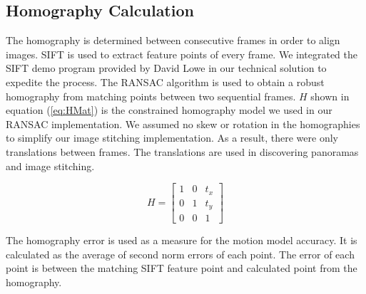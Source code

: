 \subsection{Homography Calculation} \label{sec:HomoSec}

The homography is determined between consecutive frames in order to align images.  
SIFT is used to extract feature points of every frame.  
We integrated the SIFT demo program provided by David Lowe \cite{Lowe} in our technical solution to expedite the process.  
The RANSAC algorithm is used to obtain a robust homography from matching points between two sequential frames.  
$H$ shown in equation (\ref{eq:HMat}) is the constrained homography model we used in our RANSAC implementation.  
We assumed no skew or rotation in the homographies to simplify our image stitching implementation.  
As a result, there were only translations between frames.  The translations are used in discovering panoramas and image stitching.

\begin{equation} \label{eq:HMat}
H=
\left[ \begin{array}{ccc}
1 & 0 & t_{x} \\
0 & 1 & t_{y} \\
0 & 0 & 1 \end{array} \right]
\end{equation}

The homography error is used as a measure for the motion model accuracy.  
It is calculated as the average of second norm errors of each point.   
The error of each point is between the matching SIFT feature point and calculated point from the homography.  




